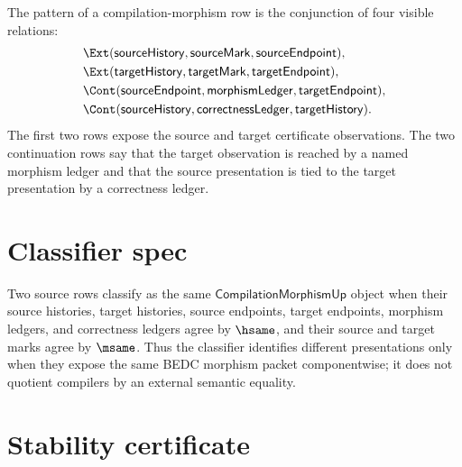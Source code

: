 \begin{definition}
\label{def:concrete-instances-compilation-morphism-pattern}
The pattern of a compilation-morphism row is the conjunction of four visible relations:
$$
\begin{aligned}
&\Ext(\mathsf{sourceHistory},\mathsf{sourceMark},\mathsf{sourceEndpoint}),\\
&\Ext(\mathsf{targetHistory},\mathsf{targetMark},\mathsf{targetEndpoint}),\\
&\Cont(\mathsf{sourceEndpoint},\mathsf{morphismLedger},\mathsf{targetEndpoint}),\\
&\Cont(\mathsf{sourceHistory},\mathsf{correctnessLedger},\mathsf{targetHistory}).
\end{aligned}
$$
The first two rows expose the source and target certificate observations. The two continuation rows say that the target observation is reached by a named morphism ledger and that the source presentation is tied to the target presentation by a correctness ledger.
\end{definition}

\section{Classifier spec}
\label{sec:concrete-instances-compilation-morphism-classifier}

\begin{definition}
\label{def:concrete-instances-compilation-morphism-classifier}
Two source rows classify as the same $\mathsf{CompilationMorphismUp}$ object when their source histories, target histories, source endpoints, target endpoints, morphism ledgers, and correctness ledgers agree by $\hsame$, and their source and target marks agree by $\msame$. Thus the classifier identifies different presentations only when they expose the same BEDC morphism packet componentwise; it does not quotient compilers by an external semantic equality.
\end{definition}

\section{Stability certificate}
\label{sec:concrete-instances-compilation-morphism-stability}

